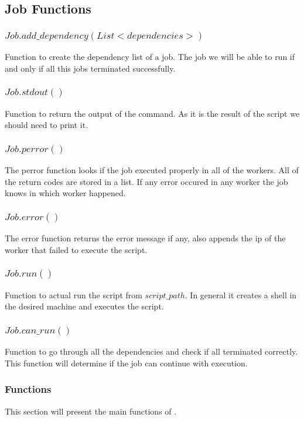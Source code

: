 \subsection*{Job Functions}
\subsubsection*{$Job.add\_dependency(List <dependencies>)$}
Function to create the dependency list of a job. The job we will be
able to run if and only if all this jobs terminated successfully.
\subsubsection*{$Job.stdout()$}
Function to return the output of the command. As it is the result of the script we should need to print it.
\subsubsection*{$Job.perror()$}
The perror function looks if the job executed properly in all of the workers. All of the return codes are stored in a list. If any error occured in any worker the job knows in which worker happened.
\subsubsection*{$Job.error()$}
The error function returns the error message if any, also appends the ip of the worker that failed to execute the script.
\subsubsection*{$Job.run()$}
Function to actual run the script from $script\_path$. In general it creates a shell in the desired machine
and executes the script.
\subsubsection*{$Job.can\_run()$}
Function to go through all the dependencies and check if all terminated correctly. This function will determine
if the job can continue with execution.

\subsubsection*{Functions}

This section will present the main functions of \lang{}.
